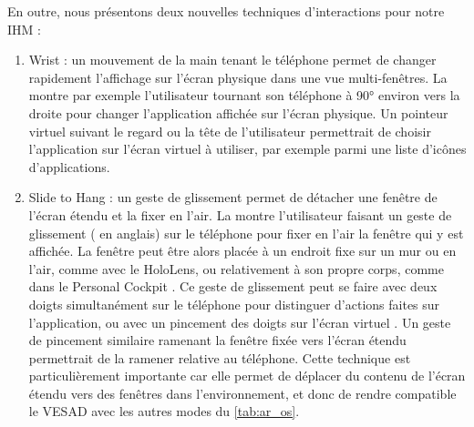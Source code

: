En outre, nous présentons deux nouvelles techniques d'interactions pour notre IHM :
\begin{enumerate}
  \item Wrist : un mouvement de la main tenant le téléphone permet de changer rapidement l'affichage sur l'écran physique dans une vue multi-fenêtres. La  montre par exemple l'utilisateur tournant son téléphone à \ang{90} environ vers la droite pour changer l'application affichée sur l'écran physique. Un pointeur virtuel suivant le regard ou la tête de l'utilisateur permettrait de choisir l'application sur l'écran virtuel à utiliser, par exemple parmi une liste d'icônes d'applications.
  \item Slide to Hang : un geste de glissement permet de détacher une fenêtre de l'écran étendu et la fixer en l'air. La  montre l'utilisateur faisant un geste de glissement ( en anglais) sur le téléphone pour fixer en l'air la fenêtre qui y est affichée. La fenêtre peut être alors placée à un endroit fixe sur un mur ou en l'air, comme avec le HoloLens, ou relativement à son propre corps, comme dans le Personal Cockpit \cite{Ens2014}. Ce geste de glissement peut se faire avec deux doigts simultanément sur le téléphone pour distinguer d'actions faites sur l'application, ou avec un pincement des doigts sur l'écran virtuel \cite{Piumsomboon2014}. Un geste de pincement similaire ramenant la fenêtre fixée vers l'écran étendu permettrait de la ramener relative au téléphone. Cette technique est particulièrement importante car elle permet de déplacer du contenu de l'écran étendu vers des fenêtres dans l'environnement, et donc de rendre compatible le VESAD avec les autres modes du \autoref{tab:ar_os}.
\end{enumerate}